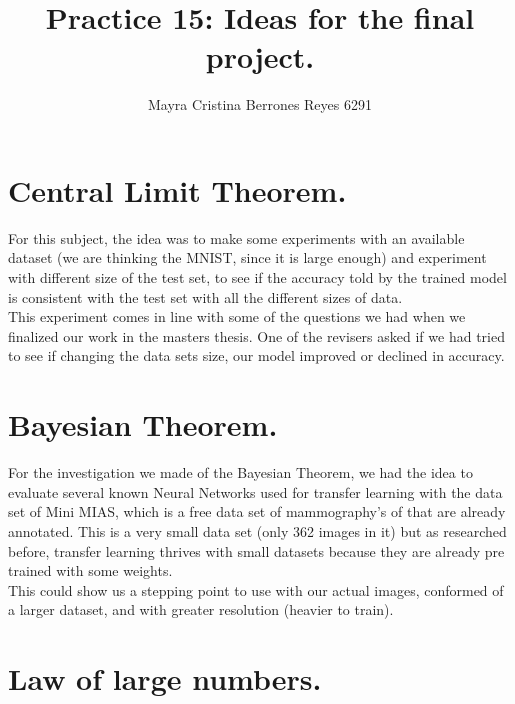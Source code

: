 \documentclass{article}
\begin{document}
\title{%
  Practice 15: Ideas for the final project. } %
\author{Mayra Cristina Berrones Reyes 6291}

\maketitle

\section{Central Limit Theorem.}

For this subject, the idea was to make some experiments with an available dataset (we are thinking the MNIST, since it is large enough) and experiment with different size of the test set, to see if the accuracy told by the trained model is consistent with the test set with all the different sizes of data.\\

This experiment comes in line with some of the questions we had when we finalized our work in the masters thesis. One of the revisers asked if we had tried to see if changing the data sets size, our model improved or declined in accuracy.\\


\section{Bayesian Theorem.}


For the investigation we made of the Bayesian Theorem, we had the idea to evaluate several known Neural Networks used for transfer learning with the data set of Mini MIAS, which is a free data set of mammography's of that are already annotated. This is a very small data set (only 362 images in it) but as researched before, transfer learning thrives with small datasets because they are already pre trained with some weights. \\

This could show us a stepping point to use with our actual images, conformed of a larger dataset, and with greater resolution (heavier to train).\\


\section{Law of large numbers.}
\end{document}
